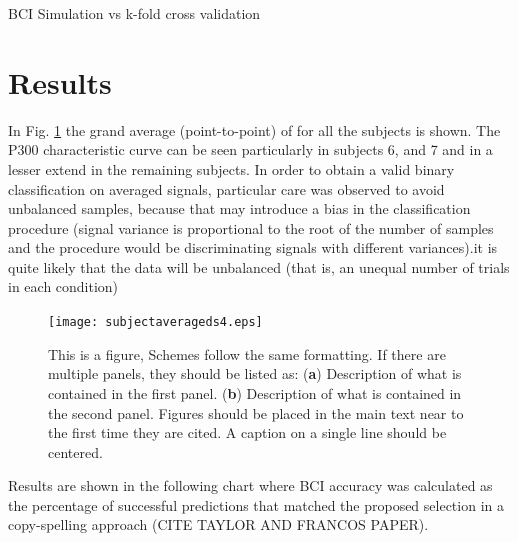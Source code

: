 \documentclass[entropy,article,submit,moreauthors,pdftex,10pt,a4paper]{mdpi}
\begin{document}
BCI Simulation vs k-fold cross validation

\section{Results}

In Fig. \ref{fig:subjectaveraged} the grand average (point-to-point) of for all the subjects is shown.  The P300 characteristic curve can be seen particularly in subjects 6, and 7 and in a lesser extend in the remaining subjects. In order to obtain a valid binary classification on averaged signals, particular care was observed to avoid unbalanced samples, because that may introduce a bias in the classification procedure (signal variance is proportional to the root of the number of samples and the procedure would be discriminating signals with different variances).it is quite likely that the data will be unbalanced (that is, an unequal number of trials in each condition)


\begin{figure}[H]
\centering
\texttt{[image: subjectaverageds4.eps]}
\caption{This is a figure, Schemes follow the same formatting. If there are multiple panels, they should be listed as: (\textbf{a}) Description of what is contained in the first panel. (\textbf{b}) Description of what is contained in the second panel. Figures should be placed in the main text near to the first time they are cited. A caption on a single line should be centered.}
\label{fig:subjectaveraged}
\end{figure}

Results are shown in the following chart where BCI accuracy
was calculated as the percentage of successful predictions
that matched the proposed selection in a copy-spelling approach (CITE TAYLOR AND  FRANCOS PAPER).
\end{document}
